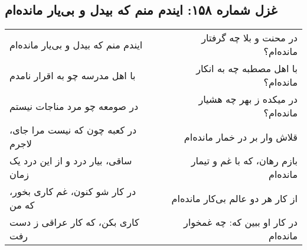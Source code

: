 \begin{center}
\section*{غزل شماره ۱۵۸: ایندم منم که بیدل و بی‌یار مانده‌ام}
\label{sec:158}
\begin{longtable}{l p{0.5cm} r}
ایندم منم که بیدل و بی‌یار مانده‌ام
&&
در محنت و بلا چه گرفتار مانده‌ام؟
\\
با اهل مدرسه چو به اقرار نامدم
&&
با اهل مصطبه چه به انکار مانده‌ام؟
\\
در صومعه چو مرد مناجات نیستم
&&
در میکده ز بهر چه هشیار مانده‌ام؟
\\
در کعبه چون که نیست مرا جای، لاجرم
&&
قلاش وار بر در خمار مانده‌ام
\\
ساقی، بیار درد و از این درد یک زمان
&&
بازم رهان، که با غم و تیمار مانده‌ام
\\
در کار شو کنون، غم کاری بخور، که من
&&
از کار هر دو عالم بی‌کار مانده‌ام
\\
کاری بکن، که کار عراقی ز دست رفت
&&
در کار او ببین که: چه غمخوار مانده‌ام
\\
\end{longtable}
\end{center}
